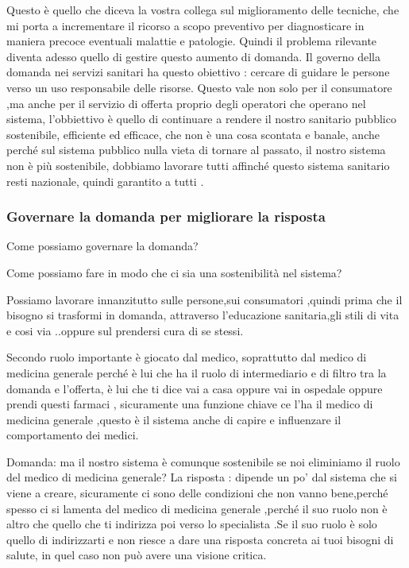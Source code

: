 Questo è quello che diceva la vostra collega sul miglioramento delle
tecniche, che mi porta a incrementare il ricorso a scopo preventivo per
diagnosticare in maniera precoce eventuali malattie e patologie. Quindi
il problema rilevante diventa adesso quello di gestire questo aumento di
domanda. Il governo della domanda nei servizi sanitari ha questo
obiettivo : cercare di guidare le persone verso un uso responsabile
delle risorse. Questo vale non solo per il consumatore ,ma anche per il
servizio di offerta proprio degli operatori che operano nel sistema,
l'obbiettivo è quello di continuare a rendere il nostro sanitario
pubblico sostenibile, efficiente ed efficace, che non è una cosa
scontata e banale, anche perché sul sistema pubblico nulla vieta di
tornare al passato, il nostro sistema non è più sostenibile, dobbiamo
lavorare tutti affinché questo sistema sanitario resti nazionale, quindi
garantito a tutti .

\subsubsection{Governare la domanda per migliorare la risposta}

Come possiamo governare la domanda?

Come possiamo fare in modo che ci sia una sostenibilità nel sistema?

Possiamo lavorare innanzitutto sulle persone,sui consumatori ,quindi
prima che il bisogno si trasformi in domanda, attraverso l'educazione
sanitaria,gli stili di vita e cosi via ..oppure sul prendersi cura di se
stessi.

Secondo ruolo importante è giocato dal medico, soprattutto dal medico di
medicina generale perché è lui che ha il ruolo di intermediario e di
filtro tra la domanda e l'offerta, è lui che ti dice vai a casa oppure
vai in ospedale oppure prendi questi farmaci , sicuramente una funzione
chiave ce l'ha il medico di medicina generale ,questo è il sistema anche
di capire e influenzare il comportamento dei medici.

Domanda: ma il nostro sistema è comunque sostenibile se noi eliminiamo
il ruolo del medico di medicina generale? La risposta : dipende un po'
dal sistema che si viene a creare, sicuramente ci sono delle condizioni
che non vanno bene,perché spesso ci si lamenta del medico di medicina
generale ,perché il suo ruolo non è altro che quello che ti indirizza
poi verso lo specialista .Se il suo ruolo è solo quello di indirizzarti
e non riesce a dare una risposta concreta ai tuoi bisogni di salute, in
quel caso non può avere una visione critica.

